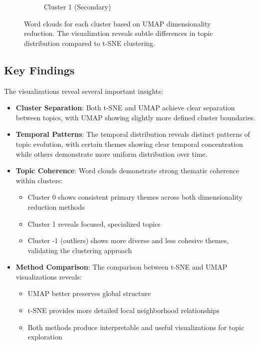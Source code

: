 \documentclass[conference]{IEEEtran}
\begin{document}
\begin{figure}[!t]
\begin{subfigure}[b]{0.3\textwidth}
    \caption{Cluster 1 (Secondary)}
\end{subfigure}
\caption{Word clouds for each cluster based on UMAP dimensionality reduction. The visualization reveals subtle differences in topic distribution compared to t-SNE clustering.}
\label{fig:wordcloud-umap}
\end{figure}

\subsection{Key Findings}
The visualizations reveal several important insights:

\begin{itemize}
    \item \textbf{Cluster Separation}: Both t-SNE and UMAP achieve clear separation between topics, with UMAP showing slightly more defined cluster boundaries.
    
    \item \textbf{Temporal Patterns}: The temporal distribution reveals distinct patterns of topic evolution, with certain themes showing clear temporal concentration while others demonstrate more uniform distribution over time.
    
    \item \textbf{Topic Coherence}: Word clouds demonstrate strong thematic coherence within clusters:
    \begin{itemize}
        \item Cluster 0 shows consistent primary themes across both dimensionality reduction methods
        \item Cluster 1 reveals focused, specialized topics
        \item Cluster -1 (outliers) shows more diverse and less cohesive themes, validating the clustering approach
    \end{itemize}
    
    \item \textbf{Method Comparison}: The comparison between t-SNE and UMAP visualizations reveals:
    \begin{itemize}
        \item UMAP better preserves global structure
        \item t-SNE provides more detailed local neighborhood relationships
        \item Both methods produce interpretable and useful visualizations for topic exploration
    \end{itemize}
\end{itemize}
\end{document}
